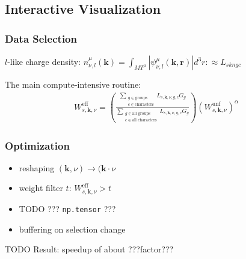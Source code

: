 \documentclass{beamer}
\begin{document}
\subsection{Interactive Visualization}
\label{sec:visualization}

\begin{frame}
    \frametitle{Data Selection}
    \(l\)-like charge density: \(n_{\nu,l}^\mu(\mathbf{k}) = \int_{MT^\mu} |\psi_{\nu,l}^\mu(\mathbf{k,r})| d^3r :\approx L_{skngc}\) 

    The main compute-intensive routine:
    \begin{align*}
      W^{\text{eff}}_{s,\mathbf{k},\nu} = \left( \frac{\sum\limits_{\substack{g \in \text{groups} \\ c \in \text{characters}}} L_{s,\mathbf{k},\nu,g,c} G_g}{\sum\limits_{\substack{g \in \text{all groups} \\ c \in \text{all characters}}} L_{s,\mathbf{k},\nu,g,c} G_g} \right) \left(W_{s,\mathbf{k},\nu}^{\text{unf}}\right)^\alpha
    \end{align*}
\end{frame}
% 

\begin{frame}
    \frametitle{Optimization}
    \begin{itemize}
    \item reshaping \((\mathbf{k},\nu) \rightarrow (\mathbf{k} \cdot \nu\)
    \item weight filter \(t\): \(W^{\text{eff}}_{s,\mathbf{k},\nu} > t\)
    \item TODO ??? \texttt{np.tensor} ???
    \item buffering on selection change
    \end{itemize}
    TODO Result: speedup of about ???factor??? 
\end{frame}
\end{document}
